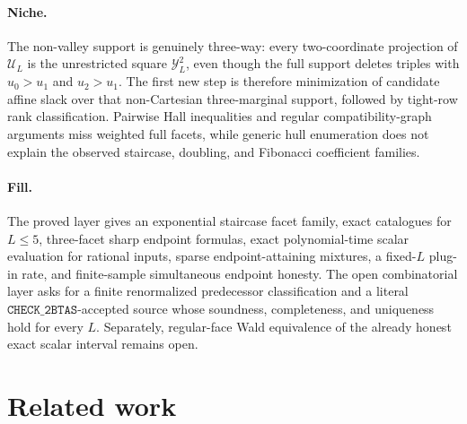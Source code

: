 \documentclass{article}
\begin{document}
\paragraph{Niche.} The non-valley support is genuinely three-way: every two-coordinate projection of \(\mathcal U_L\) is the unrestricted square \(\mathcal Y_L^2\), even though the full support deletes triples with \(u_0>u_1\) and \(u_2>u_1\). The first new step is therefore minimization of candidate affine slack over that non-Cartesian three-marginal support, followed by tight-row rank classification. Pairwise Hall inequalities and regular compatibility-graph arguments miss weighted full facets, while generic hull enumeration does not explain the observed staircase, doubling, and Fibonacci coefficient families.

\paragraph{Fill.} The proved layer gives an exponential staircase facet family, exact catalogues for \(L\le5\), three-facet sharp endpoint formulas, exact polynomial-time scalar evaluation for rational inputs, sparse endpoint-attaining mixtures, a fixed-\(L\) plug-in rate, and finite-sample simultaneous endpoint honesty.  The open combinatorial layer asks for a finite renormalized predecessor classification and a literal \(\texttt{CHECK\_2BTAS}\)-accepted source whose soundness, completeness, and uniqueness hold for every \(L\).  Separately, regular-face Wald equivalence of the already honest exact scalar interval remains open.

\section{Related work}
\end{document}
